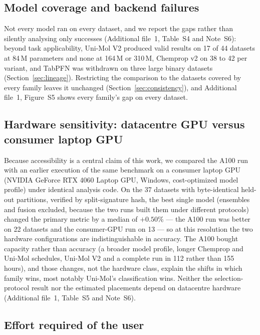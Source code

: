 

\subsection{Model coverage and backend failures}\label{sec:failures}

Not every model ran on every dataset, and we report the gaps rather than silently analysing only successes (Additional file~1, Table~S4 and Note~S6): beyond task applicability, Uni-Mol V2 produced valid results on 17 of 44 datasets at 84\,M parameters and none at 164\,M or 310\,M, Chemprop v2 on 38 to 42 per variant, and TabPFN was withdrawn on three large binary datasets (Section~\ref{sec:lineage}). Restricting the comparison to the datasets covered by every family leaves it unchanged (Section~\ref{sec:consistency}), and Additional file~1, Figure~S5 shows every family's gap on every dataset.

\subsection{Hardware sensitivity: datacentre GPU versus consumer laptop GPU}\label{sec:hardware}

Because accessibility is a central claim of this work, we compared the A100 run with an earlier execution of the same benchmark on a consumer laptop GPU (NVIDIA GeForce RTX 4060 Laptop GPU, Windows, cost-optimized model profile) under identical analysis code. On the 37 datasets with byte-identical held-out partitions, verified by split-signature hash, the best single model (ensembles and fusion excluded, because the two runs built them under different protocols) changed the primary metric by a median of $+0.50$\% --- the A100 run was better on 22 datasets and the consumer-GPU run on 13 --- so at this resolution the two hardware configurations are indistinguishable in accuracy. The A100 bought capacity rather than accuracy (a broader model profile, longer Chemprop and Uni-Mol schedules, Uni-Mol V2 and a complete run in 112 rather than 155 hours), and those changes, not the hardware class, explain the shifts in which family wins, most notably Uni-Mol's classification wins. Neither the selection-protocol result nor the estimated placements depend on datacentre hardware (Additional file~1, Table~S5 and Note~S6).

\subsection{Effort required of the user}\label{sec:effort}

